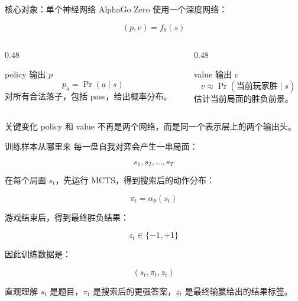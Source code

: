 \documentclass[UTF8,aspectratio=169,10pt]{ctexbeamer}
\begin{document}
\begin{frame}{核心对象：单个神经网络}
  AlphaGo Zero 使用一个深度网络：

  \[
    (p,v)=f_{\theta}(s)
  \]

  \begin{columns}[T,onlytextwidth]
    \begin{column}{0.48\textwidth}
      \begin{block}{policy 输出 $p$}
        \[
          p_a = \Pr(a\mid s)
        \]
        对所有合法落子，包括 pass，给出概率分布。
      \end{block}
    \end{column}
    \begin{column}{0.48\textwidth}
      \begin{block}{value 输出 $v$}
        \[
          v \approx \Pr(\text{当前玩家胜}\mid s)
        \]
        估计当前局面的胜负前景。
      \end{block}
    \end{column}
  \end{columns}

  \begin{alertblock}{关键变化}
    policy 和 value 不再是两个网络，而是同一个表示层上的两个输出头。
  \end{alertblock}
\end{frame}

\begin{frame}{训练样本从哪里来}
  \small
  每一盘自我对弈会产生一串局面：

  \[
    s_1,s_2,\ldots,s_T
  \]

  在每个局面 $s_t$，先运行 MCTS，得到搜索后的动作分布：

  \[
    \pi_t=\alpha_{\theta}(s_t)
  \]

  游戏结束后，得到最终胜负结果：

  \[
    z_t \in \{-1,+1\}
  \]

  因此训练数据是：

  \[
    (s_t,\pi_t,z_t)
  \]

  \begin{block}{直观理解}
    $s_t$ 是题目，$\pi_t$ 是搜索后的更强答案，$z_t$ 是最终输赢给出的结果标签。
  \end{block}
\end{frame}
\end{document}
